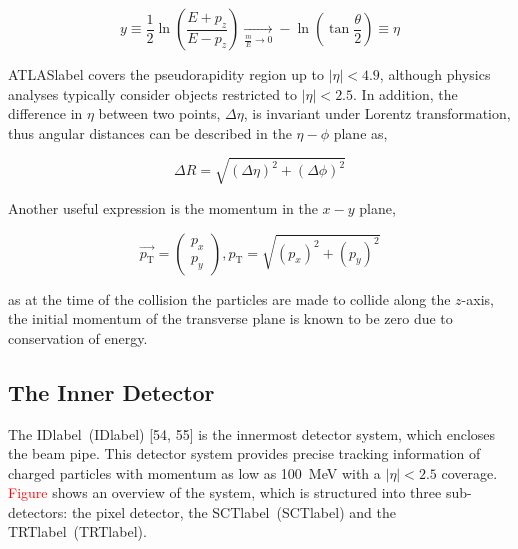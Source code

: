 \begin{equation}
   y \equiv \frac{1}{2}\ln\left(\frac{E+p_z}{E-p_z}\right) \xrightarrow[ \frac{m}{E} \to 0]{} -\ln\left(\tan\frac{\theta}{2}\right)\equiv \eta
\end{equation}

\acrshort{ATLASlabel} covers the pseudorapidity region up to $|\eta|<4.9$, although physics analyses
typically consider objects restricted to $|\eta|<2.5$. In addition, the difference in $\eta$ between two points, $\Delta\eta$, is invariant under Lorentz transformation, thus angular distances can be described in the $\eta-\phi$ plane as,

\begin{equation}
    \Delta R = \sqrt{\left(\Delta\eta\right)^2+\left(\Delta\phi\right)^2}
\end{equation}

Another useful expression is the momentum in the $x-y$ plane, 

\begin{equation}
    \vec{p_\text{T}} = \begin{pmatrix} p_x \\ p_y \end{pmatrix}, p_\text{T} = \sqrt{\left(p_x\right)^2+\left(p_y\right)^2}
\end{equation}

as at the time of the collision the particles are made to collide along the $z$-axis, the initial momentum of the transverse plane is known to be zero due to conservation of energy.

\subsection{The Inner Detector}

The \acrlong{IDlabel}~(\acrshort{IDlabel}) [54, 55] is the innermost detector system, which encloses the beam pipe. This detector system provides precise tracking information of charged particles with momentum as low as 100~MeV with a $|\eta|<2.5$ coverage. \textcolor{red}{Figure} shows an overview of the system, which is structured into three sub-detectors: the pixel detector, the \acrlong{SCTlabel}~(\acrshort{SCTlabel}) and the \acrlong{TRTlabel}~(\acrshort{TRTlabel}).



